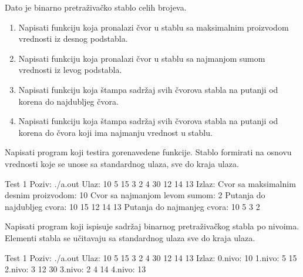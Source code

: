\begin{Exercise}[label=711]
Dato je binarno pretraživačko stablo celih brojeva.
\begin{enumerate}
\item Napisati funkciju koja pronalazi čvor u stablu sa maksimalnim proizvodom vrednosti iz desnog podstabla.
\item Napisati funkciju koja pronalazi čvor u stablu sa najmanjom sumom vrednosti iz levog podstabla.
\item Napisati funkciju  koja štampa sadržaj svih čvorova stabla na putanji od korena do najdubljeg čvora.
\item Napisati funkciju koja štampa sadržaj svih čvorova stabla na putanji od korena do čvora koji ima najmanju vrednost u stablu.
\end{enumerate}
Napisati program koji testira gorenavedene funkcije. Stablo formirati na osnovu vrednosti koje se unose
sa standardnog ulaza, sve do kraja ulaza.


\begin{maxitest}
\begin{test}{Test 1}
Poziv: ./a.out
Ulaz: 
	10 5 15 3 2 4 30 12 14 13
Izlaz: 
	Cvor sa maksimalnim desnim proizvodom: 10
	Cvor sa najmanjom levom sumom: 2
	Putanja do najdubljeg cvora: 10 15 12 14 13
	Putanja do najmanjeg cvora: 10 5 3 2
\end{test}
\end{maxitest}
\end{Exercise}

\begin{Answer}[ref=711]
\end{Answer}


\begin{Exercise}[label=712]
Napisati program koji ispisuje sadržaj binarnog pretraživačkog stabla po nivoima. Elementi stabla se učitavaju sa standardnog ulaza sve do kraja ulaza.

\begin{maxitest}
\begin{test}{Test 1}
Poziv: ./a.out
Ulaz: 
	10 5 15 3 2 4 30 12 14 13
Izlaz: 
	0.nivo: 10
	1.nivo: 5 15
	2.nivo: 3 12 30
	3.nivo: 2 4 14
	4.nivo: 13
\end{test}
\end{maxitest}

\end{Exercise}

\begin{Answer}[ref=712]
\end{Answer}




